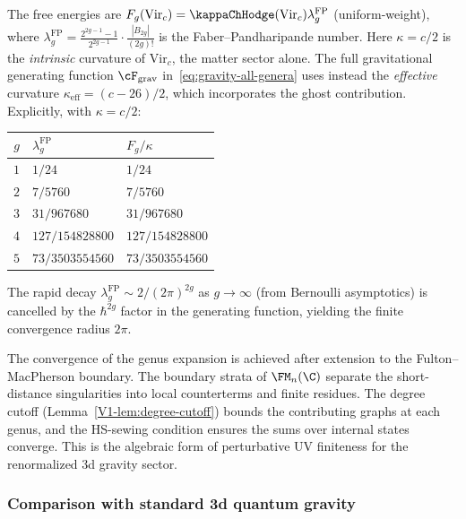 The free energies are
$F_g(\mathrm{Vir}_c)=\kappaChHodge(\mathrm{Vir}_c)
\lambda_g^{\mathrm{FP}}$
\textup{(}uniform-weight\textup{)}, where
$\lambda_g^{\mathrm{FP}}
= \frac{2^{2g-1}-1}{2^{2g-1}} \cdot \frac{|B_{2g}|}{(2g)!}$
is the Faber--Pandharipande number.
Here $\kappa = c/2$ is the \emph{intrinsic} curvature of
$\mathrm{Vir}_c$, the matter sector alone. The full
gravitational generating function
$\cF_{\mathrm{grav}}$ in~\eqref{eq:gravity-all-genera} uses
instead the \emph{effective} curvature
$\kappa_{\mathrm{eff}} = (c - 26)/2$, which incorporates the
ghost contribution. Explicitly, with $\kappa = c/2$:

\begin{center}
\small
\renewcommand{\arraystretch}{1.15}
\begin{tabular}{c|l|l}
$g$ & $\lambda_g^{\mathrm{FP}}$
 & $F_g / \kappa$ \\
\hline
$1$ & $1/24$ & $1/24$ \\[2pt]
$2$ & $7/5760$ & $7/5760$ \\[2pt]
$3$ & $31/967680$ & $31/967680$ \\[2pt]
$4$ & $127/154828800$ & $127/154828800$ \\[2pt]
$5$ & $73/3503554560$ & $73/3503554560$
\end{tabular}
\end{center}

\noindent
The rapid decay $\lambda_g^{\mathrm{FP}} \sim 2/(2\pi)^{2g}$
as $g \to \infty$ (from Bernoulli asymptotics) is
cancelled by the $\hbar^{2g}$ factor in the generating
function, yielding the finite convergence radius $2\pi$.

\begin{remark}
\label{rem:gravity-no-uv}
The convergence of the genus expansion is achieved after extension to
the Fulton--MacPherson boundary. The boundary strata of $\FM_n(\C)$
separate the short-distance singularities into local counterterms
and finite residues. The degree cutoff
(Lemma~\ref{V1-lem:degree-cutoff}) bounds the contributing graphs
at each genus, and the HS-sewing condition ensures the sums over
internal states converge. This is the algebraic form of perturbative
UV finiteness for the renormalized 3d gravity sector.
\end{remark}

\subsubsection*{Comparison with standard 3d quantum gravity}

